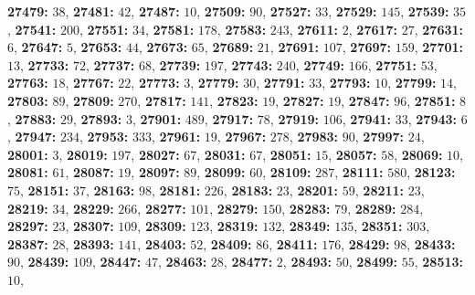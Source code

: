 \textsf{\bfseries 27479:} $38$, \textsf{\bfseries 27481:} $42$, \textsf{\bfseries 27487:} $10$, \textsf{\bfseries 27509:} $90$, \textsf{\bfseries 27527:} $33$, \textsf{\bfseries 27529:} $145$, \textsf{\bfseries 27539:} $35$, \textsf{\bfseries 27541:} $200$, \textsf{\bfseries 27551:} $34$, \textsf{\bfseries 27581:} $178$, \textsf{\bfseries 27583:} $243$, \textsf{\bfseries 27611:} $2$, \textsf{\bfseries 27617:} $27$, \textsf{\bfseries 27631:} $6$, \textsf{\bfseries 27647:} $5$, \textsf{\bfseries 27653:} $44$, \textsf{\bfseries 27673:} $65$, \textsf{\bfseries 27689:} $21$, \textsf{\bfseries 27691:} $107$, \textsf{\bfseries 27697:} $159$, \textsf{\bfseries 27701:} $13$, \textsf{\bfseries 27733:} $72$, \textsf{\bfseries 27737:} $68$, \textsf{\bfseries 27739:} $197$, \textsf{\bfseries 27743:} $240$, \textsf{\bfseries 27749:} $166$, \textsf{\bfseries 27751:} $53$, \textsf{\bfseries 27763:} $18$, \textsf{\bfseries 27767:} $22$, \textsf{\bfseries 27773:} $3$, \textsf{\bfseries 27779:} $30$, \textsf{\bfseries 27791:} $33$, \textsf{\bfseries 27793:} $10$, \textsf{\bfseries 27799:} $14$, \textsf{\bfseries 27803:} $89$, \textsf{\bfseries 27809:} $270$, \textsf{\bfseries 27817:} $141$, \textsf{\bfseries 27823:} $19$, \textsf{\bfseries 27827:} $19$, \textsf{\bfseries 27847:} $96$, \textsf{\bfseries 27851:} $8$, \textsf{\bfseries 27883:} $29$, \textsf{\bfseries 27893:} $3$, \textsf{\bfseries 27901:} $489$, \textsf{\bfseries 27917:} $78$, \textsf{\bfseries 27919:} $106$, \textsf{\bfseries 27941:} $33$, \textsf{\bfseries 27943:} $6$, \textsf{\bfseries 27947:} $234$, \textsf{\bfseries 27953:} $333$, \textsf{\bfseries 27961:} $19$, \textsf{\bfseries 27967:} $278$, \textsf{\bfseries 27983:} $90$, \textsf{\bfseries 27997:} $24$, \textsf{\bfseries 28001:} $3$, \textsf{\bfseries 28019:} $197$, \textsf{\bfseries 28027:} $67$, \textsf{\bfseries 28031:} $67$, \textsf{\bfseries 28051:} $15$, \textsf{\bfseries 28057:} $58$, \textsf{\bfseries 28069:} $10$, \textsf{\bfseries 28081:} $61$, \textsf{\bfseries 28087:} $19$, \textsf{\bfseries 28097:} $89$, \textsf{\bfseries 28099:} $60$, \textsf{\bfseries 28109:} $287$, \textsf{\bfseries 28111:} $580$, \textsf{\bfseries 28123:} $75$, \textsf{\bfseries 28151:} $37$, \textsf{\bfseries 28163:} $98$, \textsf{\bfseries 28181:} $226$, \textsf{\bfseries 28183:} $23$, \textsf{\bfseries 28201:} $59$, \textsf{\bfseries 28211:} $23$, \textsf{\bfseries 28219:} $34$, \textsf{\bfseries 28229:} $266$, \textsf{\bfseries 28277:} $101$, \textsf{\bfseries 28279:} $150$, \textsf{\bfseries 28283:} $79$, \textsf{\bfseries 28289:} $284$, \textsf{\bfseries 28297:} $23$, \textsf{\bfseries 28307:} $109$, \textsf{\bfseries 28309:} $123$, \textsf{\bfseries 28319:} $132$, \textsf{\bfseries 28349:} $135$, \textsf{\bfseries 28351:} $303$, \textsf{\bfseries 28387:} $28$, \textsf{\bfseries 28393:} $141$, \textsf{\bfseries 28403:} $52$, \textsf{\bfseries 28409:} $86$, \textsf{\bfseries 28411:} $176$, \textsf{\bfseries 28429:} $98$, \textsf{\bfseries 28433:} $90$, \textsf{\bfseries 28439:} $109$, \textsf{\bfseries 28447:} $47$, \textsf{\bfseries 28463:} $28$, \textsf{\bfseries 28477:} $2$, \textsf{\bfseries 28493:} $50$, \textsf{\bfseries 28499:} $55$, \textsf{\bfseries 28513:} $10$, 
